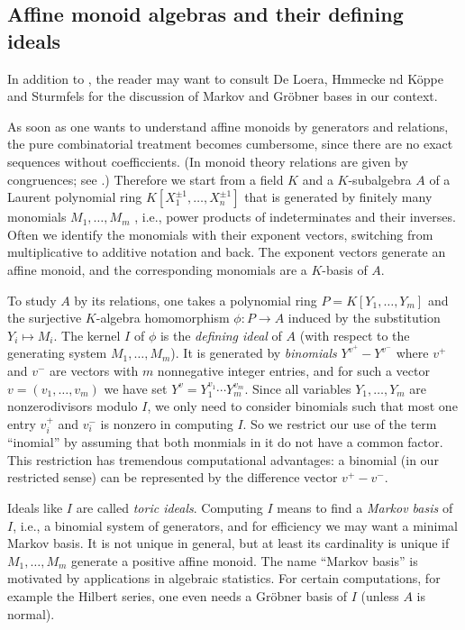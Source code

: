 \subsection{Affine monoid algebras and their defining ideals}\label{aff_mon_bin_id}


In addition to \cite{BG}, the reader may want to consult De Loera, Hmmecke nd Köppe \cite{DLHK} and Sturmfels \cite{Stu} for the discussion of Markov and Gröbner bases in our context.

As soon as one wants to understand affine monoids by generators and relations, the pure combinatorial treatment becomes cumbersome, since there are no exact sequences without coefficcients. (In monoid theory relations are given by congruences; see \cite{BG}.) Therefore we start from a field  $K$ and a $K$-subalgebra $A$ of a Laurent polynomial ring $K[X_1^{\pm1},\dots, X_n^{\pm1}]$ that is generated by finitely many monomials $M_1,\dots,M_m$ , i.e., power products of indeterminates and their inverses. Often we identify the monomials with their exponent vectors, switching from multiplicative to additive notation and back. The exponent vectors generate an affine monoid, and the corresponding monomials are a $K$-basis of $A$. 

To study $A$ by its relations, one takes a polynomial ring $P=K[Y_1,\dots,Y_m]$ and the surjective $K$-algebra homomorphism $\phi:P \to A$ induced by the substitution $Y_i\mapsto M_i$. The kernel $I$ of $\phi$ is the \emph{defining ideal} of $A$ (with respect to the generating system $M_1,\dots,M_m$). It is generated by \emph{binomials} $Y^{v^+} - Y^{v^-}$ where $v^+$ and $v^-$ are vectors with $m$ nonnegative integer entries, and for such a vector $v=(v_1,\dots,v_m)$ we have set $Y^v = Y_1^{v_1}\cdots Y_m^{v_m}$. Since all variables $Y_1,\dots,Y_m$ are nonzerodivisors modulo $I$, we only need to consider binomials  such that most one entry $v^+_i$ and $v^-_i$ is nonzero in computing $I$. So we restrict our use of the term ``inomial'' by assuming that both monmials in it do not have a common factor. This restriction has tremendous computational advantages: a binomial (in our restricted sense) can be represented by the difference vector $v^+-v^-$.

Ideals like $I$ are called \emph{toric ideals}. Computing $I$ means to find a \emph{Markov basis} of $I$, i.e., a binomial system of generators, and for efficiency we may want a minimal Markov basis. It is not unique in general, but at least its cardinality is unique if $M_1,\dots, M_m$ generate a positive affine monoid. The name ``Markov basis'' is motivated by applications in algebraic statistics.  
For certain computations, for example the Hilbert series, one even needs a Gröbner basis of $I$ (unless $A$ is normal).

